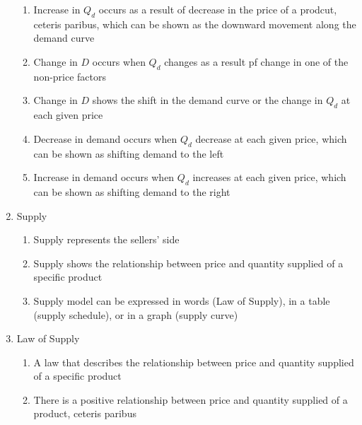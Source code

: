\documentclass[12pt]{article}
\begin{document}
\begin{enumerate}
\begin{enumerate}
          \item Increase in $Q_d$ occurs as a result of decrease in the price of a prodcut, ceteris paribus, which can be shown as the downward movement along the demand curve

          \item Change in $D$ occurs when $Q_d$ changes as a result pf change in one of the non-price factors

          \item Change in $D$ shows the shift in the demand curve or the change in $Q_d$ at each given price

          \item Decrease in demand occurs when $Q_d$ decrease at each given price, which can be shown as shifting demand to the left

          \item Increase in demand occurs when $Q_d$ increases at each given price, which can be shown as shifting demand to the right

        \end{enumerate}

      \item Supply

        \begin{enumerate}

          \item Supply represents the sellers' side

          \item Supply shows the relationship between price and quantity supplied of a specific product

          \item Supply model can be expressed in words (Law of Supply), in a table (supply schedule), or in a graph (supply curve)

        \end{enumerate}

      \item Law of Supply

        \begin{enumerate}

          \item A law that describes the relationship between price and quantity supplied of a specific product

          \item There is a positive relationship between price and quantity supplied of a product, ceteris paribus


\end{enumerate}
\end{enumerate}
\end{document}
